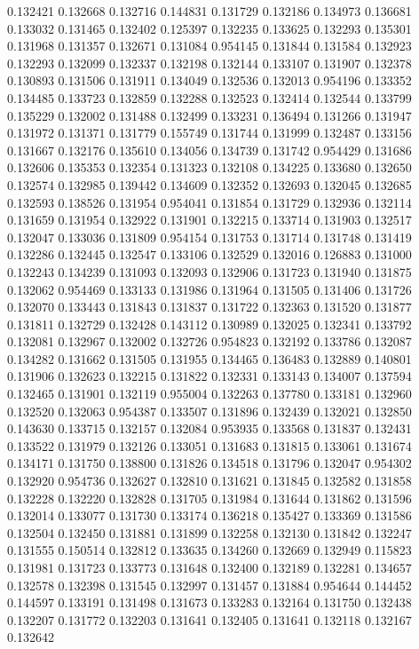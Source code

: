 0.132421
0.132668
0.132716
0.144831
0.131729
0.132186
0.134973
0.136681
0.133032
0.131465
0.132402
0.125397
0.132235
0.133625
0.132293
0.135301
0.131968
0.131357
0.132671
0.131084
0.954145
0.131844
0.131584
0.132923
0.132293
0.132099
0.132337
0.132198
0.132144
0.133107
0.131907
0.132378
0.130893
0.131506
0.131911
0.134049
0.132536
0.132013
0.954196
0.133352
0.134485
0.133723
0.132859
0.132288
0.132523
0.132414
0.132544
0.133799
0.135229
0.132002
0.131488
0.132499
0.133231
0.136494
0.131266
0.131947
0.131972
0.131371
0.131779
0.155749
0.131744
0.131999
0.132487
0.133156
0.131667
0.132176
0.135610
0.134056
0.134739
0.131742
0.954429
0.131686
0.132606
0.135353
0.132354
0.131323
0.132108
0.134225
0.133680
0.132650
0.132574
0.132985
0.139442
0.134609
0.132352
0.132693
0.132045
0.132685
0.132593
0.138526
0.131954
0.954041
0.131854
0.131729
0.132936
0.132114
0.131659
0.131954
0.132922
0.131901
0.132215
0.133714
0.131903
0.132517
0.132047
0.133036
0.131809
0.954154
0.131753
0.131714
0.131748
0.131419
0.132286
0.132445
0.132547
0.133106
0.132529
0.132016
0.126883
0.131000
0.132243
0.134239
0.131093
0.132093
0.132906
0.131723
0.131940
0.131875
0.132062
0.954469
0.133133
0.131986
0.131964
0.131505
0.131406
0.131726
0.132070
0.133443
0.131843
0.131837
0.131722
0.132363
0.131520
0.131877
0.131811
0.132729
0.132428
0.143112
0.130989
0.132025
0.132341
0.133792
0.132081
0.132967
0.132002
0.132726
0.954823
0.132192
0.133786
0.132087
0.134282
0.131662
0.131505
0.131955
0.134465
0.136483
0.132889
0.140801
0.131906
0.132623
0.132215
0.131822
0.132331
0.133143
0.134007
0.137594
0.132465
0.131901
0.132119
0.955004
0.132263
0.137780
0.133181
0.132960
0.132520
0.132063
0.954387
0.133507
0.131896
0.132439
0.132021
0.132850
0.143630
0.133715
0.132157
0.132084
0.953935
0.133568
0.131837
0.132431
0.133522
0.131979
0.132126
0.133051
0.131683
0.131815
0.133061
0.131674
0.134171
0.131750
0.138800
0.131826
0.134518
0.131796
0.132047
0.954302
0.132920
0.954736
0.132627
0.132810
0.131621
0.131845
0.132582
0.131858
0.132228
0.132220
0.132828
0.131705
0.131984
0.131644
0.131862
0.131596
0.132014
0.133077
0.131730
0.133174
0.136218
0.135427
0.133369
0.131586
0.132504
0.132450
0.131881
0.131899
0.132258
0.132130
0.131842
0.132247
0.131555
0.150514
0.132812
0.133635
0.134260
0.132669
0.132949
0.115823
0.131981
0.131723
0.133773
0.131648
0.132400
0.132189
0.132281
0.134657
0.132578
0.132398
0.131545
0.132997
0.131457
0.131884
0.954644
0.144452
0.144597
0.133191
0.131498
0.131673
0.133283
0.132164
0.131750
0.132438
0.132207
0.131772
0.132203
0.131641
0.132405
0.131641
0.132118
0.132167
0.132642
